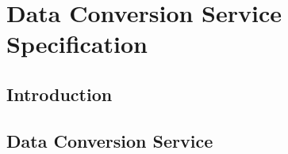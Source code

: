 \chapter{Data Conversion Service Specification}
\section{Introduction}
\section{Data Conversion Service}
\orgcishellserviceconversion{}
